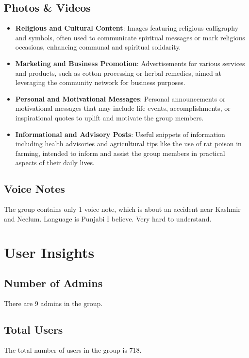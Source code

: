 \documentclass[12pt]{article}
\begin{document}
\subsection{Photos \& Videos}
\begin{itemize}
  \item \textbf{Religious and Cultural Content}: Images featuring religious calligraphy and symbols, often used to communicate spiritual messages or mark religious occasions, enhancing communal and spiritual solidarity.
  \item \textbf{Marketing and Business Promotion}: Advertisements for various services and products, such as cotton processing or herbal remedies, aimed at leveraging the community network for business purposes.
  \item \textbf{Personal and Motivational Messages}: Personal announcements or motivational messages that may include life events, accomplishments, or inspirational quotes to uplift and motivate the group members.
  \item \textbf{Informational and Advisory Posts}: Useful snippets of information including health advisories and agricultural tips like the use of rat poison in farming, intended to inform and assist the group members in practical aspects of their daily lives.
\end{itemize}


\subsection{Voice Notes}
The group contains only 1 voice note, which is about an accident near Kashmir and Neelum. Language is Punjabi I believe. Very hard to understand.

\section{User Insights}
\subsection{Number of Admins}
There are 9 admins in the group.

\subsection{Total Users}
The total number of users in the group is 718.
\end{document}
